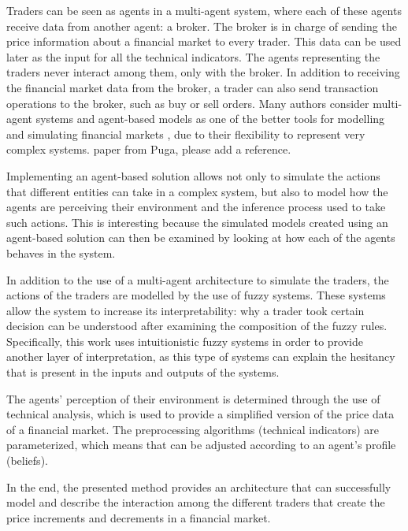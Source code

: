 Traders can be seen as agents in a multi-agent system, where each of these
agents receive data from another agent: a broker. The broker is in charge of
sending the price information about a financial market to every trader. This
data can be used later as the input for all the technical indicators. The agents
representing the traders never interact among them, only with the broker. In
addition to receiving the financial market data from the broker, a trader can
also send transaction operations to the broker, such as buy or sell orders. Many
authors consider multi-agent systems and agent-based models as one of the better
tools for modelling and simulating financial markets \cite{Lebaron2001}
\cite{Gamil2007} \cite{Boer-Sorban2008} \cite{Suarez2008} \cite{Suarez2012}, due
to their flexibility to represent very complex systems. %
paper from Puga, please add a reference.

Implementing an agent-based solution allows not only to simulate the actions
that different entities can take in a complex system, but also to model how the
agents are perceiving their environment and the inference process used to take
such actions. This is interesting because the simulated models created using an
agent-based solution can then be examined by looking at how each of the agents
behaves in the system.

In addition to the use of a multi-agent architecture to simulate the traders,
the actions of the traders are modelled by the use of fuzzy systems. These
systems allow the system to increase its interpretability: why a trader took
certain decision can be understood after examining the composition of the fuzzy
rules. Specifically, this work uses intuitionistic fuzzy systems in order to
provide another layer of interpretation, as this type of systems can explain the
hesitancy that is present in the inputs and outputs of the systems.

The agents' perception of their environment is determined through the use of
technical analysis, which is used to provide a simplified version of the price
data of a financial market. The preprocessing algorithms (technical indicators)
are parameterized, which means that can be adjusted according to an agent's
profile (beliefs).

In the end, the presented method provides an architecture that can successfully
model and describe the interaction among the different traders that create the
price increments and decrements in a financial market.




